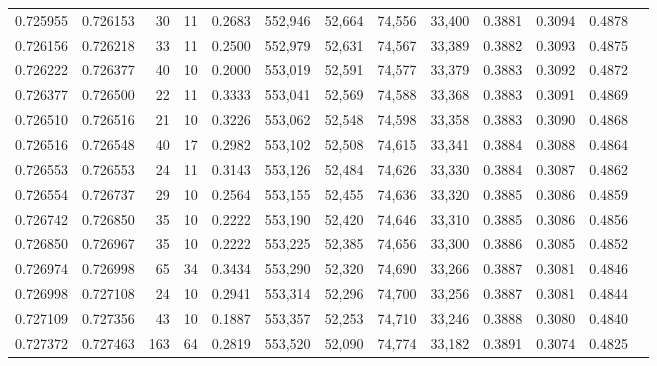 \begin{tabular}{rrrrrrrrrrrrr}
0.725955 & 0.726153 &    30 &  11 &                                     0.2683 & 552,946 &  52,664 &  74,556 &  33,400 & 0.3881 & 0.3094 & 0.4878 \\
0.726156 & 0.726218 &    33 &  11 &                                     0.2500 & 552,979 &  52,631 &  74,567 &  33,389 & 0.3882 & 0.3093 & 0.4875 \\
0.726222 & 0.726377 &    40 &  10 &                                     0.2000 & 553,019 &  52,591 &  74,577 &  33,379 & 0.3883 & 0.3092 & 0.4872 \\
0.726377 & 0.726500 &    22 &  11 &                                     0.3333 & 553,041 &  52,569 &  74,588 &  33,368 & 0.3883 & 0.3091 & 0.4869 \\
0.726510 & 0.726516 &    21 &  10 &                                     0.3226 & 553,062 &  52,548 &  74,598 &  33,358 & 0.3883 & 0.3090 & 0.4868 \\
0.726516 & 0.726548 &    40 &  17 &                                     0.2982 & 553,102 &  52,508 &  74,615 &  33,341 & 0.3884 & 0.3088 & 0.4864 \\
0.726553 & 0.726553 &    24 &  11 &                                     0.3143 & 553,126 &  52,484 &  74,626 &  33,330 & 0.3884 & 0.3087 & 0.4862 \\
0.726554 & 0.726737 &    29 &  10 &                                     0.2564 & 553,155 &  52,455 &  74,636 &  33,320 & 0.3885 & 0.3086 & 0.4859 \\
0.726742 & 0.726850 &    35 &  10 &                                     0.2222 & 553,190 &  52,420 &  74,646 &  33,310 & 0.3885 & 0.3086 & 0.4856 \\
0.726850 & 0.726967 &    35 &  10 &                                     0.2222 & 553,225 &  52,385 &  74,656 &  33,300 & 0.3886 & 0.3085 & 0.4852 \\
0.726974 & 0.726998 &    65 &  34 &                                     0.3434 & 553,290 &  52,320 &  74,690 &  33,266 & 0.3887 & 0.3081 & 0.4846 \\
0.726998 & 0.727108 &    24 &  10 &                                     0.2941 & 553,314 &  52,296 &  74,700 &  33,256 & 0.3887 & 0.3081 & 0.4844 \\
0.727109 & 0.727356 &    43 &  10 &                                     0.1887 & 553,357 &  52,253 &  74,710 &  33,246 & 0.3888 & 0.3080 & 0.4840 \\
0.727372 & 0.727463 &   163 &  64 &                                     0.2819 & 553,520 &  52,090 &  74,774 &  33,182 & 0.3891 & 0.3074 & 0.4825 \\

\end{tabular}
